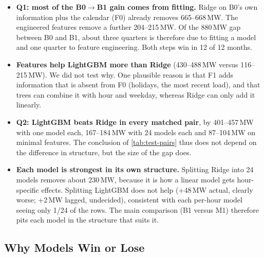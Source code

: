\begin{itemize}
  \item \textbf{Q1: most of the B0$\to$B1 gain comes from fitting.} Ridge on B0's own information
        plus the calendar (F0) already removes 665--668\,MW. The engineered features remove a further
        204--215\,MW. Of the 880\,MW gap between B0 and B1, about three quarters is therefore due to
        fitting a model and one quarter to feature engineering. Both steps win in 12 of 12 months.
  \item \textbf{Features help LightGBM more than Ridge} (430--488\,MW versus 116--215\,MW). We did
        not test why. One plausible reason is that F1 adds information that is absent from F0
        (holidays, the most recent load), and that trees can combine it with hour and weekday,
        whereas Ridge can only add it linearly.
  \item \textbf{Q2: LightGBM beats Ridge in every matched pair}, by 401--457\,MW with one model each,
        167--184\,MW with 24 models each and 87--104\,MW on minimal features. The conclusion of
        \cref{tab:test-pairs} thus does not depend on the difference in structure, but the size of
        the gap does.
  \item \textbf{Each model is strongest in its own structure.} Splitting Ridge into 24 models
        removes about 230\,MW, because it is how a linear model gets hour-specific effects. Splitting
        LightGBM does not help (+48\,MW actual, clearly worse; +2\,MW lagged, undecided), consistent
        with each per-hour model seeing only 1/24 of the rows. The main comparison (B1 versus M1)
        therefore pits each model in the structure that suits it.
\end{itemize}

\subsection{Why Models Win or Lose}
\label{sec:eval-why}

